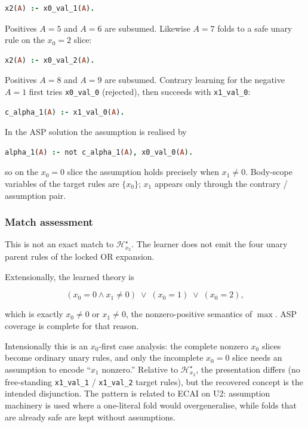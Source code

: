 \documentclass[11pt]{article}
\begin{document}
\begin{lstlisting}[style=logic,language=Prolog]
x2(A) :- x0_val_1(A).
\end{lstlisting}

Positives \(A=5\) and \(A=6\) are subsumed. Likewise \(A=7\) folds to a safe unary rule on the \(x_0=2\) slice:

\begin{lstlisting}[style=logic,language=Prolog]
x2(A) :- x0_val_2(A).
\end{lstlisting}

Positives \(A=8\) and \(A=9\) are subsumed. Contrary learning for the negative \(A=1\) first tries \texttt{x0\_val\_0} (rejected), then succeeds with \texttt{x1\_val\_0}:

\begin{lstlisting}[style=logic,language=Prolog]
c_alpha_1(A) :- x1_val_0(A).
\end{lstlisting}

In the ASP solution the assumption is realised by

\begin{lstlisting}[style=logic,language=Prolog]
alpha_1(A) :- not c_alpha_1(A), x0_val_0(A).
\end{lstlisting}

so on the \(x_0=0\) slice the assumption holds precisely when \(x_1\neq 0\). Body-scope variables of the target rules are \(\{x_0\}\); \(x_1\) appears only through the contrary / assumption pair.

\subsubsection{Match assessment}

This is not an exact match to \(\mathcal{H}_{x_2}^\star\). The learner does not emit the four unary parent rules of the locked OR expansion.

Extensionally, the learned theory is

\[ (x_0=0 \land x_1\neq 0)\;\lor\;(x_0=1)\;\lor\;(x_0=2), \]

which is exactly \(x_0\neq 0\) or \(x_1\neq 0\), the nonzero-positive semantics of \(\max\). ASP coverage is complete for that reason.

Intensionally this is an \(x_0\)-first case analysis: the complete nonzero \(x_0\) slices become ordinary unary rules, and only the incomplete \(x_0=0\) slice needs an assumption to encode ``\(x_1\) nonzero.'' Relative to \(\mathcal{H}_{x_2}^\star\), the presentation differs (no free-standing \texttt{x1\_val\_1} / \texttt{x1\_val\_2} target rules), but the recovered concept is the intended disjunction. The pattern is related to ECAI on U2: assumption machinery is used where a one-literal fold would overgeneralise, while folds that are already safe are kept without assumptions.
\end{document}
